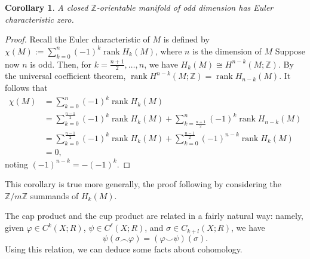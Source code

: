 \documentclass{book}
\newcommand{\bbZ}{\mathbb{Z}}
\newcommand{\bbZmod}[1]{\bbZ/{#1}\bbZ}
\renewcommand{\phi}{\varphi}
\DeclareMathOperator{\rank}{rank}
\newtheorem{corollary}[theorem]{Corollary}
\theoremstyle{definition}
\theoremstyle{remark}
\numberwithin{equation}{section}
\begin{document}
\begin{corollary}
    A closed $\bbZ$-orientable manifold of odd dimension has Euler characteristic zero.
\end{corollary}
\begin{proof}
    Recall the Euler characteristic of $M$ is defined by $\chi(M) := \sum_{k=0}^n (-1)^k \rank{H_k(M)}$, where $n$ is the dimension of $M$ Suppose now $n$ is odd. Then, for $k = \frac{n+1}{2},\dots,n$, we have $H_k(M) \cong H^{n-k}(M;\bbZ)$. By the universal coefficient theorem, $\rank{H^{n-k}(M;\bbZ)} = \rank{H_{n-k}(M)}$. It follows that
    \begin{equation} \begin{aligned}
        \chi(M) 
        &= \sum_{k=0}^n (-1)^k \rank{H_k(M)} \\
        &= \sum_{k=0}^{\frac{n-1}{2}} (-1)^k \rank{H_k(M)} + \sum_{k=\frac{n+1}{2}}^n (-1)^k \rank{H_{n-k}(M)} \\
        &= \sum_{k=0}^{\frac{n-1}{2}} (-1)^k \rank{H_k(M)} + \sum_{k=0}^{\frac{n-1}{2}} (-1)^{n-k} \rank{H_k(M)} \\
        &= 0,
    \end{aligned} \end{equation}
    noting $(-1)^{n-k} = - (-1)^k$.
\end{proof}
This corollary is true more generally, the proof following by considering the $\bbZmod{m}$ summands of $H_k(M)$.

The cap product and the cup product are related in a fairly natural way: namely, given $\phi \in C^k(X;R)$, $\psi \in C^\ell(X;R)$, and $\sigma \in C_{k+l}(X;R)$, we have
\begin{equation}
    \psi(\sigma \frown \phi) = (\phi \smile \psi)(\sigma).
\end{equation}
Using this relation, we can deduce some facts about cohomology.
\end{document}
